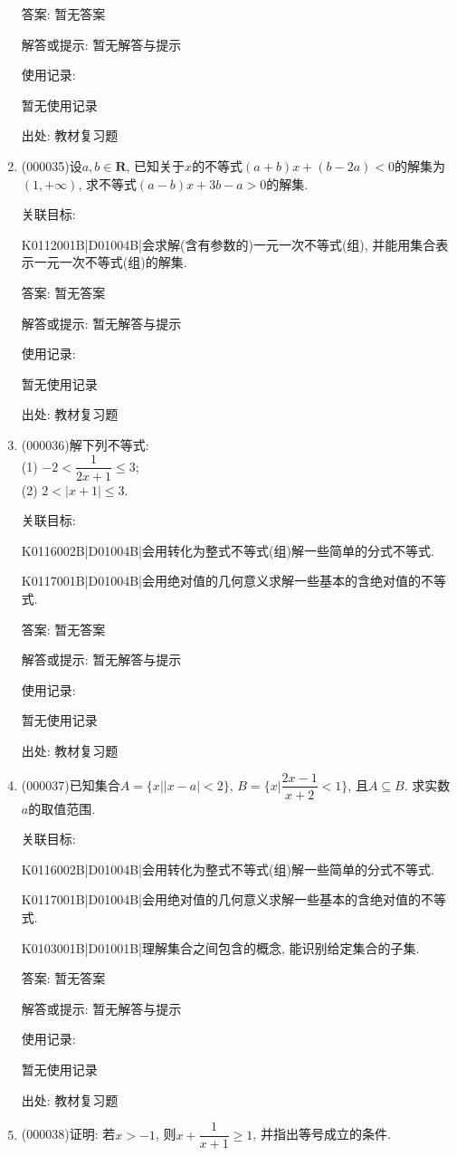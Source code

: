 \documentclass[10pt,a4paper]{article}
\begin{document}
\begin{enumerate}[1.]
答案: 暂无答案

解答或提示: 暂无解答与提示

使用记录:

暂无使用记录


出处: 教材复习题
\item { (000035)}设$a,b\in \mathbf{R}$, 已知关于$x$的不等式$(a+b)x+(b-2a)<0$的解集为$(1, +\infty)$, 求不等式$(a-b)x+3b-a>0$的解集.


关联目标:

K0112001B|D01004B|会求解(含有参数的)一元一次不等式(组), 并能用集合表示一元一次不等式(组)的解集.

答案: 暂无答案

解答或提示: 暂无解答与提示

使用记录:

暂无使用记录


出处: 教材复习题
\item { (000036)}解下列不等式:\\
(1) $-2< \dfrac 1{2x+1}\le 3$;\\
(2) $2<|x+1|\le 3$.


关联目标:

K0116002B|D01004B|会用转化为整式不等式(组)解一些简单的分式不等式.

K0117001B|D01004B|会用绝对值的几何意义求解一些基本的含绝对值的不等式.

答案: 暂无答案

解答或提示: 暂无解答与提示

使用记录:

暂无使用记录


出处: 教材复习题
\item { (000037)}已知集合$A=\{x||x-a|<2\}$, $B=\{x|\dfrac{2x-1}{x+2}<1\}$, 且$A\subseteq B$. 求实数$a$的取值范围.


关联目标:

K0116002B|D01004B|会用转化为整式不等式(组)解一些简单的分式不等式.

K0117001B|D01004B|会用绝对值的几何意义求解一些基本的含绝对值的不等式.

K0103001B|D01001B|理解集合之间包含的概念, 能识别给定集合的子集.

答案: 暂无答案

解答或提示: 暂无解答与提示

使用记录:

暂无使用记录


出处: 教材复习题
\item { (000038)}证明: 若$x>-1$, 则$x+\dfrac 1{x+1}\ge 1$, 并指出等号成立的条件.



\end{enumerate}
\end{document}
